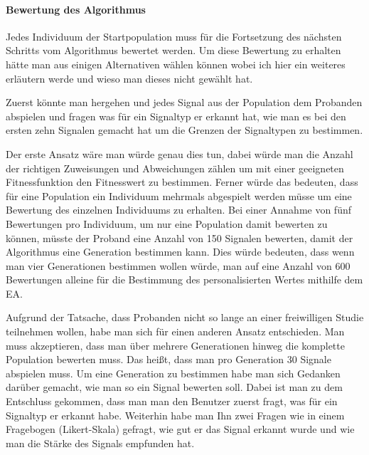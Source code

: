 


\paragraph{Bewertung des Algorithmus}

Jedes Individuum der Startpopulation muss f{\"u}r die Fortsetzung des n{\"a}chsten Schritts vom Algorithmus bewertet werden.
Um diese Bewertung zu erhalten h{\"a}tte man aus einigen Alternativen w{\"a}hlen k{\"o}nnen wobei ich hier ein weiteres erl{\"a}utern werde und wieso man dieses nicht gew{\"a}hlt hat. 

Zuerst k{\"o}nnte man hergehen und jedes Signal aus der Population dem Probanden abspielen und fragen was f{\"u}r ein Signaltyp er erkannt hat, wie man es bei den ersten zehn Signalen gemacht hat um die Grenzen der Signaltypen zu bestimmen. 

Der erste Ansatz w{\"a}re man w{\"u}rde genau dies tun, dabei w{\"u}rde man die Anzahl der richtigen Zuweisungen und Abweichungen z{\"a}hlen um mit einer geeigneten Fitnessfunktion den Fitnesswert zu bestimmen. Ferner w{\"u}rde das bedeuten, dass f{\"u}r eine Population ein Individuum mehrmals abgespielt werden m{\"u}sse um eine Bewertung des einzelnen Individuums zu erhalten. Bei einer Annahme von f{\"u}nf Bewertungen pro Individuum, um nur eine Population damit bewerten zu k{\"o}nnen, m{\"u}sste der Proband eine Anzahl von 150 Signalen bewerten, damit der Algorithmus eine Generation bestimmen kann. Dies w{\"u}rde bedeuten, dass wenn man vier Generationen bestimmen wollen w{\"u}rde, man auf eine Anzahl von 600 Bewertungen alleine f{\"u}r die Bestimmung des personalisierten Wertes mithilfe dem EA. 

Aufgrund der Tatsache, dass Probanden nicht so lange an einer freiwilligen Studie teilnehmen wollen, habe man sich f{\"u}r einen anderen Ansatz entschieden. Man muss akzeptieren, dass man {\"u}ber mehrere Generationen hinweg die komplette Population bewerten muss. Das hei{\ss}t, dass man pro Generation 30 Signale abspielen muss. Um eine Generation zu bestimmen habe man sich Gedanken dar{\"u}ber gemacht, wie man so ein Signal bewerten soll. Dabei ist man zu dem Entschluss gekommen, dass man man den Benutzer zuerst fragt, was f{\"u}r ein Signaltyp er erkannt habe. Weiterhin habe man Ihn zwei Fragen wie in einem Fragebogen (Likert-Skala) gefragt, wie gut er das Signal erkannt wurde und wie man die St{\"a}rke des Signals empfunden hat. 

